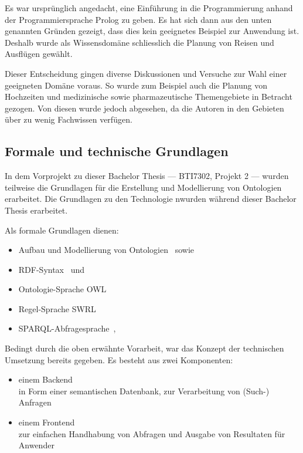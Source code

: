 Es war ursprünglich angedacht, eine Einführung in die Programmierung anhand der Programmiersprache Prolog zu geben. Es hat sich dann aus den unten genannten Gründen gezeigt, dass dies kein geeignetes Beispiel zur Anwendung ist. Deshalb wurde als Wissensdomäne schliesslich die Planung von Reisen und Ausflügen gewählt.

Dieser Entscheidung gingen diverse Diskussionen und Versuche zur Wahl einer geeigneten Domäne voraus. So wurde zum Beispiel auch die Planung von Hochzeiten und medizinische sowie pharmazeutische Themengebiete in Betracht gezogen. Von diesen wurde jedoch abgesehen, da die Autoren in den Gebieten über zu wenig Fachwissen verfügen.

\newpage

\subsection{Formale und technische Grundlagen}
\label{sub:formale_und_technische_grundlagen}
In dem Vorprojekt zu dieser Bachelor Thesis --- BTI7302, Projekt 2 --- wurden teilweise die Grundlagen für die Erstellung und Modellierung von Ontologien erarbeitet. Die Grundlagen zu den Technologie nwurden während dieser Bachelor Thesis erarbeitet.

Als formale Grundlagen dienen:
\begin{itemize}
    \item Aufbau und Modellierung von Ontologien~\cite{IspekOntoBedeutung} sowie~\cite{ISpekOntoGeschichte}
    \item RDF-Syntax~\cite{w3rdf} und~\cite{w3rdf_syntax}
    \item Ontologie-Sprache OWL~\cite{w3owl}
    \item Regel-Sprache SWRL~\cite{swrl}
    \item SPARQL-Abfragesprache~\cite{w3sparql_querylang},~\cite{w3sparql_overview}
\end{itemize}

Bedingt durch die oben erwähnte Vorarbeit, war das Konzept der technischen Umsetzung bereits gegeben. Es besteht aus zwei Komponenten:
\begin{itemize}
    \item einem Backend\\
        in Form einer semantischen Datenbank, zur Verarbeitung von (Such-) Anfragen
    \item einem Frontend\\
        zur einfachen Handhabung von Abfragen und Ausgabe von Resultaten für Anwender
\end{itemize}

